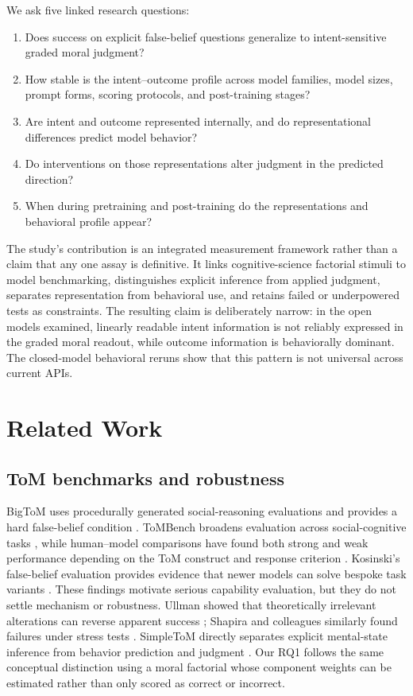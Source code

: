 \documentclass[11pt]{article}
\begin{document}
We ask five linked research questions:
\begin{enumerate}[leftmargin=*,label=\textbf{RQ\arabic*:}]
    \item Does success on explicit false-belief questions generalize to intent-sensitive graded moral judgment?
    \item How stable is the intent--outcome profile across model families, model sizes, prompt forms, scoring protocols, and post-training stages?
    \item Are intent and outcome represented internally, and do representational differences predict model behavior?
    \item Do interventions on those representations alter judgment in the predicted direction?
    \item When during pretraining and post-training do the representations and behavioral profile appear?
\end{enumerate}

The study's contribution is an integrated measurement framework rather than a claim that any one assay is definitive.
It links cognitive-science factorial stimuli to model benchmarking, distinguishes explicit inference from applied judgment, separates representation from behavioral use, and retains failed or underpowered tests as constraints.
The resulting claim is deliberately narrow: in the open models examined, linearly readable intent information is not reliably expressed in the graded moral readout, while outcome information is behaviorally dominant.
The closed-model behavioral reruns show that this pattern is not universal across current APIs.

\section{Related Work}

\subsection{ToM benchmarks and robustness}

BigToM uses procedurally generated social-reasoning evaluations and provides a hard false-belief condition \citep{gandhi2023bigtom}.
ToMBench broadens evaluation across social-cognitive tasks \citep{chen2024tombench}, while human--model comparisons have found both strong and weak performance depending on the ToM construct and response criterion \citep{strachan2024testing}.
Kosinski's false-belief evaluation provides evidence that newer models can solve bespoke task variants \citep{kosinski2024evaluating}.
These findings motivate serious capability evaluation, but they do not settle mechanism or robustness.
Ullman showed that theoretically irrelevant alterations can reverse apparent success \citep{ullman2023alterations}; Shapira and colleagues similarly found failures under stress tests \citep{shapira2024clever}.
SimpleToM directly separates explicit mental-state inference from behavior prediction and judgment \citep{gu2026simpletom}.
Our RQ1 follows the same conceptual distinction using a moral factorial whose component weights can be estimated rather than only scored as correct or incorrect.
\end{document}

